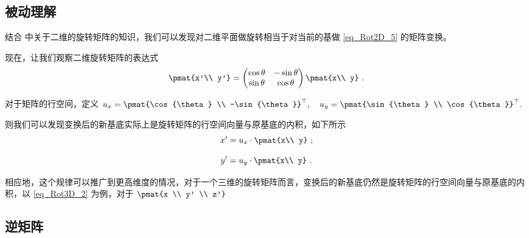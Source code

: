 \subsection{被动理解}

结合  中关于二维的旋转矩阵的知识，我们可以发现对二维平面做旋转相当于对当前的基做 \autoref{eq_Rot2D_5} 的矩阵变换。

现在，让我们观察二维旋转矩阵的表达式
\begin{equation}
\pmat{x'\\ y'} =
\begin{pmatrix}
\cos\theta & - \sin\theta\\
\sin\theta &\cos\theta
\end{pmatrix}\pmat{x\\ y}~.
\end{equation}

对于矩阵的行空间，定义 $u_{x}=\pmat{\cos{\theta} \\ -\sin{\theta}}^{\top} ,\quad u_{y}=\pmat{\sin{\theta} \\ \cos{\theta}}^{\top}.$

则我们可以发现变换后的新基底实际上是旋转矩阵的行空间向量与原基底的内积，如下所示
\begin{equation}
x' = u_{x} \cdot \pmat{x\\ y} ~;
\end{equation}

\begin{equation}
y' = u_{y} \cdot \pmat{x\\ y} ~.
\end{equation}

相应地，这个规律可以推广到更高维度的情况，对于一个三维的旋转矩阵而言，变换后的新基底仍然是旋转矩阵的行空间向量与原基底的内积，以 \autoref{eq_Rot3D_2} 为例，对于 $\pmat{x \\ y' \\ z'}$



\subsection{逆矩阵}

